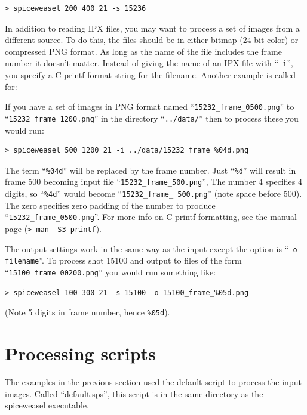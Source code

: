 \documentclass[12pt, a4paper]{article}
\begin{document}
\begin{verbatim}
> spiceweasel 200 400 21 -s 15236
\end{verbatim}

In addition to reading IPX files, you may want to process a set of images from a different
source. To do this, the files should be in either bitmap (24-bit color) or compressed PNG
format. As long as the name of the file includes the frame number it doesn't matter. Instead
of giving the name of an IPX file with ``\texttt{-i}'', 
you specify a C printf format string for the filename. Another example is called for:

If you have a set of images in PNG format named ``\texttt{15232\_frame\_0500.png}'' to 
``\texttt{15232\_frame\_1200.png}''
in the directory ``\texttt{../data/}'' then to process these you would run:

\begin{verbatim}
> spiceweasel 500 1200 21 -i ../data/15232_frame_%04d.png
\end{verbatim}

The term ``\texttt{\%04d}'' will be replaced by the frame number. 
Just ``\texttt{\%d}'' will result in frame 500 becoming input file 
``\texttt{15232\_frame\_500.png}'', The number 4 specifies
4 digits, so ``\texttt{\%4d}'' would become ``\texttt{15232\_frame\_ 500.png}''
(note space before 500). The zero specifies zero padding of the number to produce
``\texttt{15232\_frame\_0500.png}''. For more info on C printf formatting, see
the manual page (\texttt{> man -S3 printf}).

The output settings work in the same way as the input except the option is
``\texttt{-o filename}''. To process shot 15100 and output to files of the form
``\texttt{15100\_frame\_00200.png}'' you would run something like:

\begin{verbatim}
> spiceweasel 100 300 21 -s 15100 -o 15100_frame_%05d.png 
\end{verbatim}

\noindent (Note 5 digits in frame number, hence \texttt{\%05d}). 

\section{Processing scripts}

The examples in the previous section used the default script to process the
input images. Called ``default.sps'',  this script is in the same directory as
the spiceweasel executable. 
\end{document}
